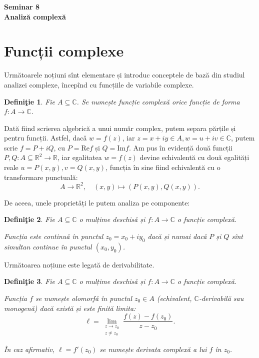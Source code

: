 \documentclass[11pt,a4paper]{article}
\newcommand\seq{\subseteq}
\newcommand\RR{\mathbb{R}}
\newcommand\CC{\mathbb{C}}
\theoremstyle{dotless}
\theoremstyle{dotlessdr}
\newtheorem{definition}{Defini\c{t}ie}
\begin{document}

\begin{center}
  {\large\textbf{Seminar 8 \\
      Analiză complexă}}
\end{center}

\vspace{2cm}

\section*{Funcții complexe}

\indent\indent Următoarele noțiuni sînt elementare și introduc conceptele
de bază din studiul analizei complexe, începînd cu funcțiile de variabile complexe.

\begin{definition}\label{def:fc-comp}
  Fie $ A \seq \CC $. Se numește \emph{funcție complexă} orice funcție de forma
  $ f : A \to \CC $.
\end{definition}

Dată fiind scrierea algebrică a unui număr complex, putem separa părțile și pentru
funcții. Astfel, dacă $ w = f(z) $, iar $ z = x + iy \in A, w = u + iv \in \CC $,
putem scrie $ f = P + iQ $, cu $ P = \mathrm{Re}f$ și $ Q = \mathrm{Im}f $. Am pus
în evidență două funcții $ P, Q : A \seq \RR^2 \to \RR $, iar egalitatea $ w = f(z) $
devine echivalentă cu două egalități reale $ u = P(x, y), v = Q(x, y) $, funcția
în sine fiind echivalentă cu o transformare punctuală:
\[
  A \to \RR^2, \quad (x, y) \mapsto (P(x, y), Q(x, y)).
\]

De aceea, unele proprietăți le putem analiza pe componente:

\begin{definition}\label{def:fc-cont}
  Fie $ A \seq \CC $ o mulțime deschisă și $ f : A \to \CC $ o funcție complexă.

  Funcția este \emph{continuă} în punctul $ z_0 = x_0 + iy_0 $ dacă și numai
  dacă $ P $ și $ Q $ sînt simultan continue în punctul $ (x_0, y_0) $.
\end{definition}

Următoarea noțiune este legată de derivabilitate.

\begin{definition}\label{def:fc-der}
  Fie $ A \seq \CC $ o mulțime deschisă și $ f : A \to \CC $ o funcție complexă.

  Funcția $ f $ se numește \emph{olomorfă} în punctul $ z_0 \in A $ (echivalent,
  \emph{$\CC$-derivabilă} sau \emph{monogenă}) dacă există și este finită limita:
  \[
    \ell = \lim_{\substack{z \to z_0 \\ z \neq z_0}} \frac{f(z) - f(z_0)}{z - z_0}.
  \]

  În caz afirmativ, $ \ell = f'(z_0) $ se numește \emph{derivata complexă} a lui
  $ f $ în $ z_0 $.
\end{definition}
\end{document}
